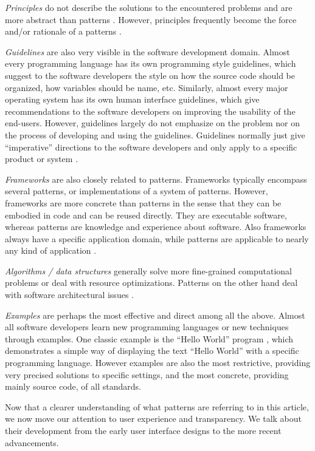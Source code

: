 \documentclass[a4paper,titlepage]{article}
\begin{document}
\textit{Principles} do not describe the solutions to the encountered
problems and are more abstract than patterns
\citep{patterns:coplien}. However, principles frequently become the
force and/or rationale of a patterns \citep{patterns:appleton}.

\textit{Guidelines} are also very visible in the software development
domain. Almost every programming language has its own programming
style guidelines, which suggest to the software developers the style
on how the source code should be organized, how variables should be
name, etc. Similarly, almost every major operating system has its own
human interface guidelines, which give recommendations to the software
developers on improving the usability of the end-users. However,
guidelines largely do not emphasize on the problem nor on the process
of developing and using the guidelines. Guidelines normally just give
``imperative'' directions to the software developers and only apply to
a specific product or system \citep{patterns:griffiths}.

\textit{Frameworks} are also closely related to patterns. Frameworks
typically encompass several patterns, or implementations of a system
of patterns. However, frameworks are more concrete than patterns in
the sense that they can be embodied in code and can be reused
directly. They are executable software, whereas patterns are knowledge
and experience about software. Also frameworks always have a specific
application domain, while patterns are applicable to nearly any kind
of application \citep{patterns:gamma}.

\textit{Algorithms / data structures} generally solve more
fine-grained computational problems or deal with resource
optimizations. Patterns on the other hand deal with software
architectural issues \citep{patterns:appleton}.

\textit{Examples} are perhaps the most effective and direct among all
the above. Almost all software developers learn new programming
languages or new techniques through examples. One classic example is
the ``Hello World'' program \citep{c:kernighan}, which demonstrates a
simple way of displaying the text ``Hello World'' with a specific
programming language. However examples are also the most restrictive,
providing very precised solutions to specific settings, and the most
concrete, providing mainly source code, of all standards.


Now that a clearer understanding of what patterns are referring to in
this article, we now move our attention to user experience and
transparency. We talk about their development from the early user
interface designs to the more recent advancements.
\end{document}
